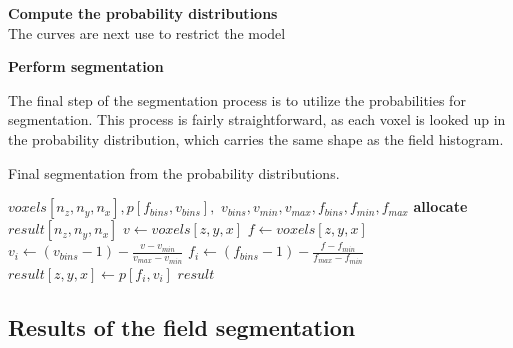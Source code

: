 \vspace{\baselineskip}
\noindent\textbf{Compute the probability distributions} \\

The curves are next use to restrict the model

\vspace{\baselineskip}
\noindent\textbf{Perform segmentation}

The final step of the segmentation process is to utilize the probabilities for segmentation.
This process is fairly straightforward, as each voxel is looked up in the probability distribution, which carries the same shape as the field histogram.


\begin{algorithm}
    \caption{Final segmentation from the probability distributions.}
    \label{alg:segment}
    \begin{algorithmic}
         {$voxels[n_z,n_y,n_x], p[f_{bins},v_{bins}],$ \newline $v_{bins}, v_{min}, v_{max}, f_{bins}, f_{min}, f_{max}$}
            \State \textbf{allocate} $result[n_z,n_y,n_x]$
                \State $v \gets voxels[z,y,x]$
                    \State $f \gets voxels[z,y,x]$
                        \State $v_i \gets (v_{bins} - 1) - \frac{v - v_{min}}{v_{max} - v_{min}}$
                        \State $f_i \gets (f_{bins} - 1) - \frac{f - f_{min}}{f_{max} - f_{min}}$
                        \State $result[z,y,x] \gets p[f_i, v_i]$
                    \EndIf
                \EndIf
            \EndFor
            \Return $result$
        \EndFunction
    \end{algorithmic}
\end{algorithm}



\subsection{Results of the field segmentation}

